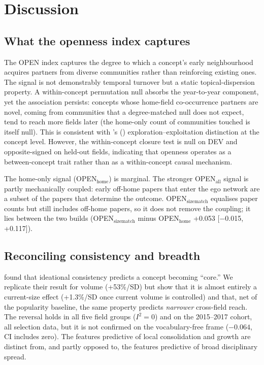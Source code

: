 \documentclass[11pt,letterpaper]{article}
\begin{document}
\section{Discussion}
\label{sec:discussion}

\subsection{What the openness index captures}

The OPEN index captures the degree to which a concept's early neighbourhood acquires partners from diverse communities rather than reinforcing existing ones. The signal is not demonstrably temporal turnover but a static topical-dispersion property. A within-concept permutation null absorbs the year-to-year component, yet the association persists: concepts whose home-field co-occurrence partners are novel, coming from communities that a degree-matched null does not expect, tend to reach more fields later (the home-only count of communities touched is itself null). This is consistent with \citeauthor{March1991}'s (\citeyear{March1991}) exploration--exploitation distinction at the concept level. However, the within-concept closure test is null on DEV and opposite-signed on held-out fields, indicating that openness operates as a between-concept trait rather than as a within-concept causal mechanism.

The home-only signal (OPEN$_{\text{home}}$) is marginal. The stronger OPEN$_{\text{all}}$ signal is partly mechanically coupled: early off-home papers that enter the ego network are a subset of the papers that determine the outcome. OPEN$_{\text{sizematch}}$ equalises paper counts but still includes off-home papers, so it does not remove the coupling; it lies between the two builds (OPEN$_{\text{sizematch}}$ minus OPEN$_{\text{home}}$ +0.053 [$-$0.015, +0.117]).

\subsection{Reconciling consistency and breadth}

\citet{Cheng2023} found that ideational consistency predicts a concept becoming ``core.'' We replicate their result for volume (+53\%/SD) but show that it is almost entirely a current-size effect (+1.3\%/SD once current volume is controlled) and that, net of the popularity baseline, the same property predicts \emph{narrower} cross-field reach. The reversal holds in all five field groups ($I^2 = 0$) and on the 2015--2017 cohort, all selection data, but it is not confirmed on the vocabulary-free frame ($-0.064$, CI includes zero). The features predictive of local consolidation and growth are distinct from, and partly opposed to, the features predictive of broad disciplinary spread.
\end{document}
